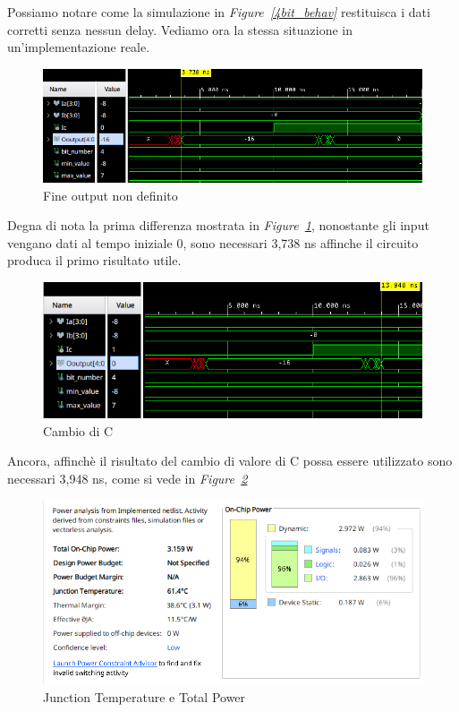 Possiamo notare come la simulazione in \textit{Figure~\ref{4bit_behav}} restituisca i dati corretti senza nessun delay. Vediamo ora la stessa situazione in
un'implementazione reale.
\begin{figure}[ht]
      \centering
      \includegraphics[width=1\textwidth]{assets/simulations/Post_Implementation/4bit/end_X.png}
      \caption{Fine output non definito}
      \label{4bit_pi_x}
\end{figure}

Degna di nota la prima differenza mostrata in \textit{Figure~\ref{4bit_pi_x}}, nonostante gli input vengano dati al tempo iniziale 0, sono necessari 3,738 ns affinche 
il circuito produca il primo risultato utile.

\begin{figure}[ht]
      \centering
      \includegraphics[width=1\textwidth]{assets/simulations/Post_Implementation/4bit/C_change.png}
      \caption{Cambio di C}
      \label{4bit_pi_c}
\end{figure}

Ancora, affinchè il risultato del cambio di valore di C possa essere utilizzato sono necessari 3,948 ns, come si vede in \textit{Figure~\ref{4bit_pi_c}}

\begin{figure}[ht]
      \centering
      \includegraphics[width=1\textwidth]{assets/simulations/Post_Implementation/4bit/power.png}
      \caption{Junction Temperature e Total Power}
      \label{4bit_power}
\end{figure}

